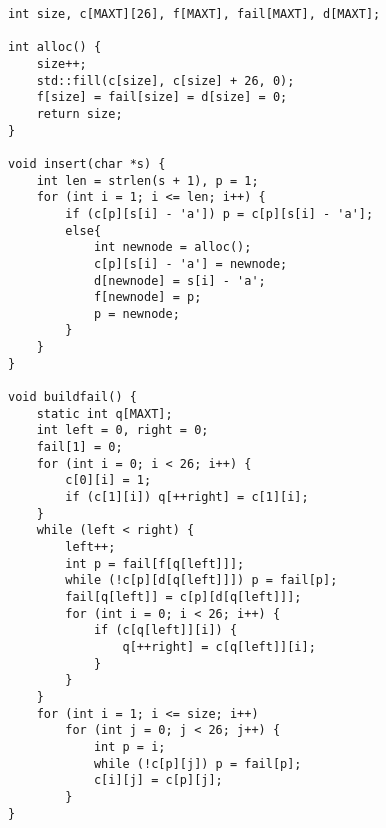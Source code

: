 \begin{lstlisting}
int size, c[MAXT][26], f[MAXT], fail[MAXT], d[MAXT];

int alloc() {
	size++;
	std::fill(c[size], c[size] + 26, 0);
	f[size] = fail[size] = d[size] = 0;
	return size;
}

void insert(char *s) {
	int len = strlen(s + 1), p = 1;
	for (int i = 1; i <= len; i++) {
		if (c[p][s[i] - 'a']) p = c[p][s[i] - 'a'];
		else{
			int newnode = alloc();
			c[p][s[i] - 'a'] = newnode;
			d[newnode] = s[i] - 'a';
			f[newnode] = p;
			p = newnode;
		}
	}
}

void buildfail() {
	static int q[MAXT];
	int left = 0, right = 0;
	fail[1] = 0;
	for (int i = 0; i < 26; i++) {
		c[0][i] = 1;
		if (c[1][i]) q[++right] = c[1][i];
	}
	while (left < right) {
		left++;
		int p = fail[f[q[left]]];
		while (!c[p][d[q[left]]]) p = fail[p];
		fail[q[left]] = c[p][d[q[left]]];
		for (int i = 0; i < 26; i++) {
			if (c[q[left]][i]) {
				q[++right] = c[q[left]][i];
			}
		}
	}
	for (int i = 1; i <= size; i++)
		for (int j = 0; j < 26; j++) {
			int p = i;
			while (!c[p][j]) p = fail[p];
			c[i][j] = c[p][j];
		}
}
\end{lstlisting}
